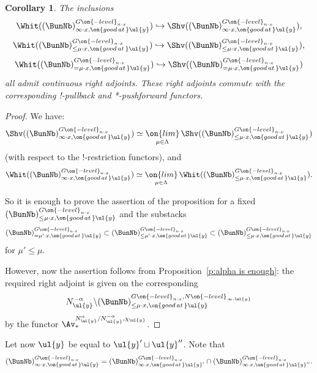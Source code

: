 \documentclass[9pt]{amsart}
\newtheorem{cor}[subsubsection]{Corollary}
\theoremstyle{definition}
\theoremstyle{remark}
\newcommand{\propref}[1]{Proposition~\ref{#1}}
\numberwithin{equation}{section}
\begin{document}
\begin{cor}  \label{c:right adj glob}
The inclusions
$$\Whit((\BunNb)_{\infty\cdot x,\on{good\,at\,}\ul{y}}^{G\on{-level}_{n\cdot x}})\hookrightarrow
\Shv((\BunNb)_{\infty\cdot x,\on{good\,at\,}\ul{y}}^{G\on{-level}_{n\cdot x}}),$$
$$\Whit((\BunNb)_{\leq \mu\cdot x,\on{good\,at\,}\ul{y}}^{G\on{-level}_{n\cdot x}})\hookrightarrow
\Shv((\BunNb)_{\leq \mu\cdot x,\on{good\,at\,}\ul{y}}^{G\on{-level}_{n\cdot x}}),$$
$$\Whit((\BunNb)_{=\mu\cdot x,\on{good\,at\,}\ul{y}}^{G\on{-level}_{n\cdot x}})\hookrightarrow
\Shv((\BunNb)_{=\mu\cdot x,\on{good\,at\,}\ul{y}}^{G\on{-level}_{n\cdot x}})$$
all admit continuous right adjoints. These right adjoints commute with the corresponding !-pullback and
*-pushforward functors. 
\end{cor}

\begin{proof}
We have:
$$\Shv((\BunNb)_{\infty\cdot x,\on{good\,at\,}\ul{y}}^{G\on{-level}_{n\cdot x}})\simeq 
\underset{\mu\in \Lambda}{\on{lim}}\, \Shv((\BunNb)_{\leq \mu\cdot x,\on{good\,at\,}\ul{y}}^{G\on{-level}_{n\cdot x}})$$
(with respect to the !-restriction functors), and 
$$\Whit((\BunNb)_{\infty\cdot x,\on{good\,at\,}\ul{y}}^{G\on{-level}_{n\cdot x}})\simeq 
\underset{\mu\in \Lambda}{\on{lim}}\, \Whit((\BunNb)_{\leq \mu\cdot x,\on{good\,at\,}\ul{y}}^{G\on{-level}_{n\cdot x}}).$$

\medskip

So it is enough to prove the assertion of the proposition for a fixed 
$(\BunNb)_{\leq \mu\cdot x,\on{good\,at\,}\ul{y}}^{G\on{-level}_{n\cdot x}}$ and the substacks
$$(\BunNb)_{=\mu'\cdot x,\on{good\,at\,}\ul{y}}^{G\on{-level}_{n\cdot x}}\subset
(\BunNb)_{\leq \mu'\cdot x,\on{good\,at\,}\ul{y}}^{G\on{-level}_{n\cdot x}}\subset 
(\BunNb)_{\leq \mu\cdot x,\on{good\,at\,}\ul{y}}^{G\on{-level}_{n\cdot x}}$$
for $\mu'\leq \mu$.

\medskip

However, now the assertion follows from \propref{p:alpha is enough}: the required right adjoint is given 
on the corresponding
$$N^{-\alpha}_{\ul{y}}\backslash 
(\BunNb)^{G\on{-level}_{n\cdot x},N\on{-level}_{\infty\cdot \ul{y}}}_{\leq \mu\cdot x,\on{good\,at\,}\ul{y}}$$
by the functor $\Av_*^{N^{\alpha}_{\ul{y}}/N^{-\alpha}_{\ul{y}},\chi_{\ul{y}}}$.

\end{proof}

\sssec{}

Let now $\ul{y}$ be equal to $\ul{y}'\sqcup \ul{y}''$. Note that 
$$(\BunNb)^{G\on{-level}_{n\cdot x}}_{\infty\cdot x,\on{good\,at\,}\ul{y}}=
(\BunNb)^{G\on{-level}_{n\cdot x}}_{\infty\cdot x,\on{good\,at\,}\ul{y}'}\cap
(\BunNb)^{G\on{-level}_{n\cdot x}}_{\infty\cdot x,\on{good\,at\,}\ul{y}''}.$$
\end{document}
